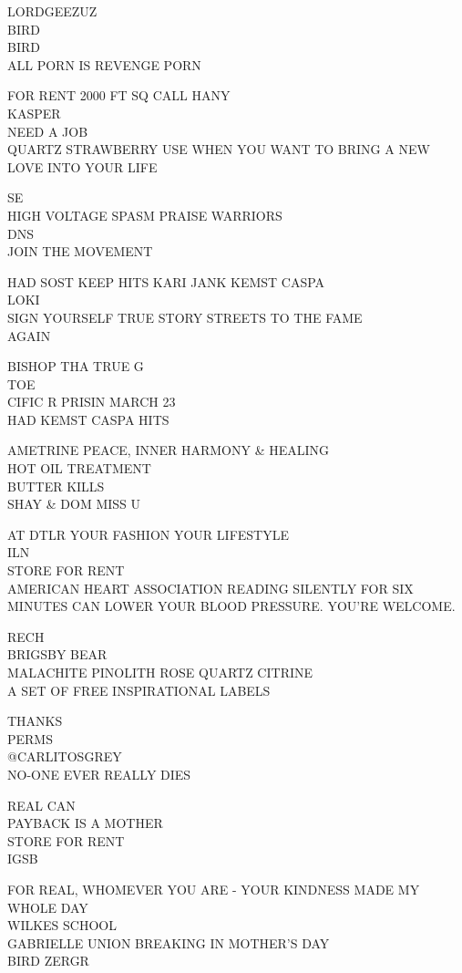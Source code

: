 \documentclass[10pt,letterpaper]{article}
\begin{document}
LORDGEEZUZ\\
BIRD\\
BIRD\\
ALL PORN IS REVENGE PORN

FOR RENT 2000 FT SQ CALL HANY\\
KASPER\\
NEED A JOB\\
QUARTZ STRAWBERRY USE WHEN YOU WANT TO BRING A NEW LOVE INTO YOUR LIFE

SE\\
HIGH VOLTAGE SPASM PRAISE WARRIORS\\
DNS\\
JOIN THE MOVEMENT

HAD SOST KEEP HITS KARI JANK KEMST CASPA\\
LOKI\\
SIGN YOURSELF TRUE STORY STREETS TO THE FAME\\
AGAIN

BISHOP THA TRUE G\\
TOE\\
CIFIC R PRISIN MARCH 23\\
HAD KEMST CASPA HITS

AMETRINE PEACE, INNER HARMONY \& HEALING\\
HOT OIL TREATMENT\\
BUTTER KILLS\\
SHAY \& DOM MISS U

AT DTLR YOUR FASHION YOUR LIFESTYLE\\
ILN\\
STORE FOR RENT\\
AMERICAN HEART ASSOCIATION READING SILENTLY FOR SIX MINUTES CAN LOWER YOUR BLOOD PRESSURE.  YOU'RE WELCOME.

RECH\\
BRIGSBY BEAR\\
MALACHITE PINOLITH ROSE QUARTZ CITRINE\\
A SET OF FREE INSPIRATIONAL LABELS

THANKS\\
PERMS\\
@CARLITOSGREY\\
NO{-}ONE EVER REALLY DIES

REAL CAN\\
PAYBACK IS A MOTHER\\
STORE FOR RENT\\
IGSB

FOR REAL, WHOMEVER YOU ARE {-} YOUR KINDNESS MADE MY WHOLE DAY\\
WILKES SCHOOL\\
GABRIELLE UNION BREAKING IN MOTHER'S DAY\\
BIRD ZERGR
\end{document}
